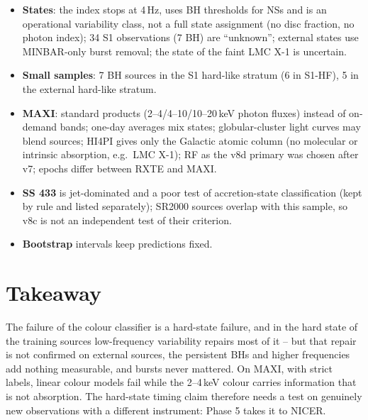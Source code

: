 \begin{itemize}
added after one inventory connection error; a trailing \verb|\r| from a Windows CSV read in bash fixed in v8d before results. Only
two of the planned v8 figures were produced; the other results are in CSV files.
\item \textbf{States}: the index stops at 4\,Hz, uses BH thresholds for NSs and is an operational variability class, not a full state
assignment (no disc fraction, no photon index); 34 S1 observations (7 BH) are ``unknown''; external states use MINBAR-only burst
removal; the state of the faint LMC X-1 is uncertain.
\item \textbf{Small samples}: 7 BH sources in the S1 hard-like stratum (6 in S1-HF), 5 in the external hard-like stratum.
\item \textbf{MAXI}: standard products (2--4/4--10/10--20\,keV photon fluxes) instead of on-demand bands; one-day averages mix states;
globular-cluster light curves may blend sources; HI4PI gives only the Galactic atomic column (no molecular or intrinsic absorption, e.g.\
LMC X-1); RF as the v8d primary was chosen after v7; epochs differ between RXTE and MAXI.
\item \textbf{SS 433} is jet-dominated and a poor test of accretion-state classification (kept by rule and listed separately); SR2000 sources
overlap with this sample, so v8c is not an independent test of their criterion.
\item \textbf{Bootstrap} intervals keep predictions fixed.
\end{itemize}

\section{Takeaway}
The failure of the colour classifier is a hard-state failure, and in the hard state of the training sources low-frequency
variability repairs most of it -- but that repair is not confirmed on external sources, the persistent BHs and higher frequencies add
nothing measurable, and bursts never mattered. On MAXI, with strict labels, linear colour models fail while the 2--4\,keV colour
carries information that is not absorption. The hard-state timing claim therefore needs a test on genuinely new observations with a
different instrument: Phase 5 takes it to NICER.

